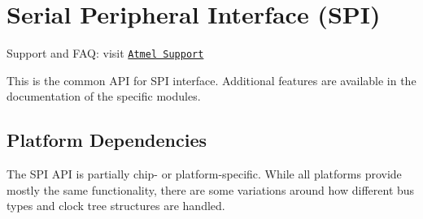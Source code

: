 \hypertarget{group__spi__group}{\section{Serial Peripheral Interface (S\-P\-I)}
\label{group__spi__group}
}
Support and F\-A\-Q\-: visit \href{http://www.atmel.com/design-support/}{\tt Atmel Support}

This is the common A\-P\-I for S\-P\-I interface. Additional features are available in the documentation of the specific modules.\hypertarget{group__spi__group_spi_group_platform}{}\subsection{Platform Dependencies}\label{group__spi__group_spi_group_platform}
The S\-P\-I A\-P\-I is partially chip-\/ or platform-\/specific. While all platforms provide mostly the same functionality, there are some variations around how different bus types and clock tree structures are handled.

